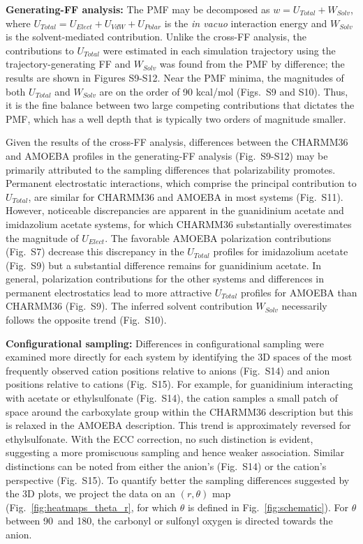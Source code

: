 \documentclass[journal=jpclcd,manuscript=article,articletitle=true,layout=twocolumn]{achemso}
\begin{document}
\textbf{Generating-FF analysis:} The PMF may be decomposed as $w = U_{Total} + W_{Solv}$, 
where  $U_{Total} = U_{Elect} + U_{VdW} + U_{Polar}$ is the \emph{in vacuo} interaction energy and $W_{Solv}$ is the solvent-mediated contribution. Unlike the cross-FF analysis, the contributions to $U_{Total}$ were estimated in each simulation trajectory using the trajectory-generating FF and $W_{Solv}$ was found from the PMF by difference; the results are shown in Figures S9-S12. Near the PMF minima, the magnitudes of both $U_{Total}$ and $W_{Solv}$ are on the order of 90 kcal/mol (Figs.~S9 and S10). Thus, it is the fine balance between two large competing contributions that dictates the PMF,\cite{Shi2017} which has a well depth that is typically two orders of magnitude smaller. 

Given the results of the cross-FF analysis, differences between the CHARMM36 and AMOEBA profiles in the generating-FF analysis (Fig.~S9-S12) may be primarily attributed to the sampling differences that polarizability promotes. Permanent electrostatic interactions, which comprise the principal contribution to $U_{Total}$, are similar for CHARMM36 and AMOEBA in most systems (Fig.~S11). However, noticeable discrepancies are apparent in the guanidinium acetate and imidazolium acetate systems, for which CHARMM36 substantially overestimates the magnitude of $U_{Elect}$. The favorable AMOEBA polarization contributions (Fig.~S7) decrease this discrepancy in the $U_{Total}$ profiles for imidazolium acetate (Fig.~S9) but a substantial difference remains for guanidinium acetate. In general, polarization contributions for the other systems and differences in permanent electrostatics lead to more attractive $U_{Total}$ profiles for AMOEBA than CHARMM36 (Fig.~S9). The inferred solvent contribution $W_{Solv}$ necessarily follows the opposite trend (Fig.~S10). 

\textbf{Configurational sampling:}  Differences in configurational sampling were examined more directly for each system by identifying the 3D spaces of the most frequently observed cation positions relative to anions (Fig.~S14) and anion positions relative to cations (Fig.~S15). For example, for guanidinium interacting with acetate or ethylsulfonate (Fig.~S14), the cation samples a small patch of space around the carboxylate group within the CHARMM36 description but this is relaxed in the AMOEBA description.  This trend is approximately reversed for ethylsulfonate. With the ECC correction, no such distinction is evident, suggesting a more promiscuous sampling and hence weaker association.  Similar distinctions can be noted from either the anion's (Fig.~S14) or the cation's perspective (Fig.~S15). To quantify better the sampling differences suggested by the 3D plots, we project the data on an $(r,\theta)$ map (Fig.~\ref{fig:heatmaps_theta_r}, for which $\theta$ is defined in Fig.~\ref{fig:schematic}). For $\theta$ between 90\textdegree \ and 180\textdegree, the carbonyl or sulfonyl oxygen is directed towards the anion.  
   
\end{document}
